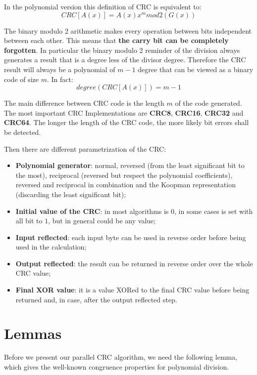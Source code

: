 \documentclass[fleqn]{IEEEtran}
\begin{document}
In the polynomial version this definition of CRC is equivalent to:
\[
   CRC[A(x)]=A(x)x^{m}mod2(G(x))
\]

The binary modulo 2 arithmetic makes every operation between bits independent
between each other. This means that \textbf{the carry bit can be completely 
forgotten}. In particular the binary modulo 2 reminder of the division always 
generates a result that is a degree less of the divisor degree. Therefore
the CRC result will always be a polynomial of $m-1$ degree that can be viewed as
a binary code of size $m$. In fact:
\[
   degree(CRC[A(x)])=m-1
\]

The main difference between CRC code is the length $m$ of
the code generated. The most important CRC Implementations are \textbf{CRC8}, 
\textbf{CRC16}, \textbf{CRC32} and \textbf{CRC64}. The longer the length of the 
CRC code, the more likely bit errors shall be detected. 

Then there are different parametrization of the CRC:
\begin{itemize}
   \item \textbf{Polynomial generator}: normal, reversed (from the least 
   significant bit to the most), reciprocal (reversed but respect the polynomial 
   coefficients), reversed and reciprocal in combination and the Koopman
   representation (discarding the least significant bit);

   \item \textbf{Initial value of the CRC}: in most algorithms is $0$, in some 
   cases is set with all bit to $1$, but in general could be any value;

   \item \textbf{Input reflected}: each input byte can be used in reverse order 
   before being used in the calculation;

   \item \textbf{Output reflected}: the result can be returned in reverse order 
   over the whole CRC value;

   \item \textbf{Final XOR value}: it is a value XORed to the final CRC value before 
   being returned and, in case, after the output reflected step.
\end{itemize}


\section{Lemmas}
Before we present our parallel CRC algorithm, we need the following lemma, 
which gives the well-known congruence properties for polynomial division.
\end{document}
